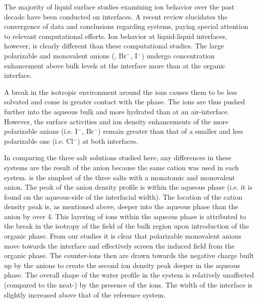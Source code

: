 The majority of liquid surface studies examining ion behavior over the past decade have been conducted on \airwat interfaces. A recent review elucidates the convergence of data and conclusions regarding \airwat systems, paying special attention to relevant computational efforts.\cite{Jungwirth2006a} Ion behavior at liquid-liquid interfaces, however, is clearly different than these \airwat computational studies. The large polarizable and monovalent anions (\cl, Br$^-$, I$^-$) undergo concentration enhancement above bulk levels at the \airwat interface more than at the organic interface.\cite{Wick2006c,Wick2007a} 

A break in the isotropic environment around the ions causes them to be less solvated and come in greater contact with the \ctc phase. The ions are thus pushed further into the aqueous bulk and more hydrated than at an air-interface. However, the surface activities and ion density enhancements of the more polarizable anions (i.e. I$^-$, Br$^-$) remain greater than that of a smaller and less polarizable one (i.e. Cl$^-$) at both interfaces. 

In comparing the three salt solutions studied here, any differences in these systems are the result of the anion because the same cation was used in each system. \nacl is the simplest of the three salts with a monatomic and monovalent anion. The peak of the anion density profile is within the aqueous phase (i.e. it is found on the aqueous-side of the interfacial width). The location of the cation density peak is, as mentioned above, deeper into the aqueous phase than the anion by over 4\angs. This layering of ions within the aqueous phase is attributed to the break in the isotropy of the field of the bulk region upon introduction of the organic phase. From our studies it is clear that polarizable monovalent anions move towards the interface and effectively screen the induced field from the organic phase. The counter-ions then are drawn towards the negative charge built up by the anions to create the second ion density peak deeper in the aqueous phase. The overall shape of the water profile in the \nacl system is relatively unaffected (compared to the neat-\ctcwat) by the presence of the ions. The width of the interface is slightly increased above that of the reference system.


